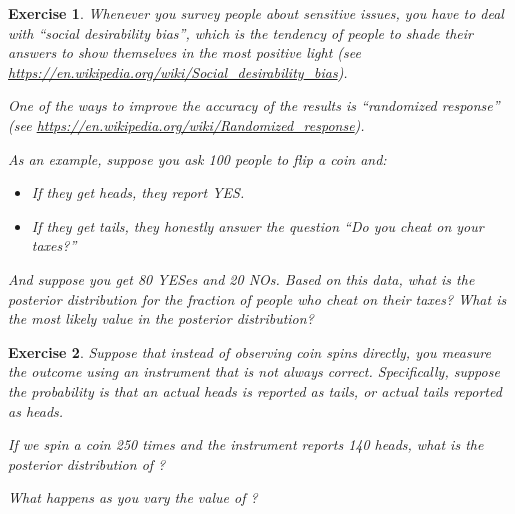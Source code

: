\documentclass[12pt]{book}
\theoremstyle{exercise}
\newtheorem{exercise}{Exercise}[chapter]
\begin{document}
\begin{exercise}
Whenever you survey people about sensitive issues, you have to deal with ``social desirability bias'', which is the tendency of people to shade their answers to show themselves in the most positive light (see \url{https://en.wikipedia.org/wiki/Social_desirability_bias}).

One of the ways to improve the accuracy of the results is ``randomized response'' (see \url{https://en.wikipedia.org/wiki/Randomized_response}).

As an example, suppose you ask 100 people to flip a coin and:

\begin{itemize}

\item If they get heads, they report YES.

\item If they get tails, they honestly answer the question ``Do you cheat on your taxes?''

\end{itemize}

And suppose you get 80 YESes and 20 NOs.  Based on this data, what is the posterior distribution for the fraction of people who cheat on their taxes?  What is the most likely value in the posterior distribution?
\end{exercise}


\begin{exercise}
Suppose that instead of observing coin spins directly, you measure the outcome using an instrument that is not always correct.  Specifically, suppose the probability is  that an actual heads is reported
as tails, or actual tails reported as heads.

If we spin a coin 250 times and the instrument reports 140 heads, what is the posterior distribution of ?

What happens as you vary the value of ?
\end{exercise}
\end{document}
